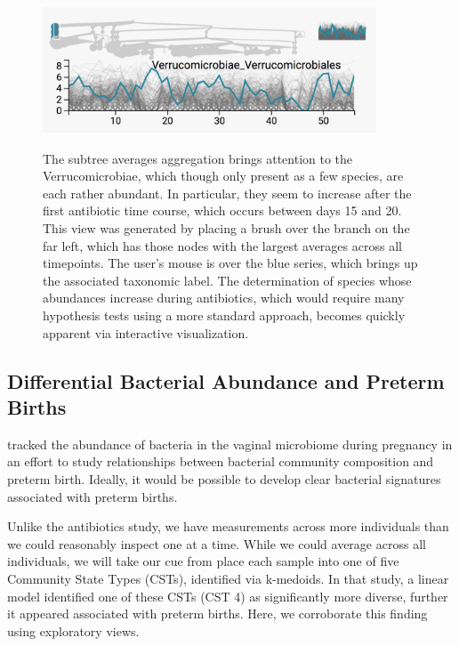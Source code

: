 \documentclass{report}
\begin{document}
\begin{figure}
{\centering \includegraphics[width=375px]{figure/treelapse/verrucomicrobiae}}
\caption{The subtree averages aggregation brings attention to the
  Verrucomicrobiae, which though only present as a few species, are each rather
  abundant. In particular, they seem to increase after the first antibiotic time
  course, which occurs between days 15 and 20. This view was generated by
  placing a brush over the branch on the far left, which has those nodes with
  the largest averages across all timepoints. The user's mouse is over the blue
  series, which brings up the associated taxonomic label. The determination of
  species whose abundances increase during antibiotics, which would require many
  hypothesis tests using a more standard approach, becomes quickly apparent
  via interactive visualization.}\label{fig:verrucomicrobiae}
\end{figure}

\subsection{Differential Bacterial Abundance and Preterm Births}
\label{differential-bacterial-abundance-and-preterm-births}

\citet{digiulio2015temporal}
tracked the abundance of bacteria in the vaginal microbiome during
pregnancy in an effort to study relationships between bacterial
community composition and preterm birth. Ideally, it would be possible
to develop clear bacterial signatures associated with preterm births.

Unlike the antibiotics study, we have measurements across more
individuals than we could reasonably inspect one at a time. While we
could average across all individuals, we will take our cue from
\citep{digiulio2015temporal}
place each sample into one of five Community State Types (CSTs),
identified via k-medoids. In that study, a linear model identified one
of these CSTs (CST 4) as significantly more diverse, further it appeared
associated with preterm births. Here, we corroborate this finding using
exploratory views.
\end{document}

